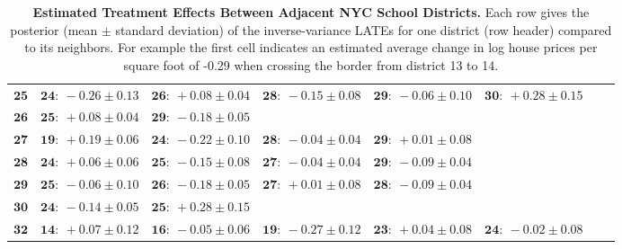 \begin{landscape}
\begin{table}[p]
\begin{tabular}{r|lllllll}
\( \mathbf{25} \)& \( \mathbf{24:}~-0.26 \pm 0.13 \)& \( \mathbf{26:}~+0.08 \pm 0.04 \)& \( \mathbf{28:}~-0.15 \pm 0.08 \)& \( \mathbf{29:}~-0.06 \pm 0.10 \)& \( \mathbf{30:}~+0.28 \pm 0.15 \)\\ 
\( \mathbf{26} \)& \( \mathbf{25:}~+0.08 \pm 0.04 \)& \( \mathbf{29:}~-0.18 \pm 0.05 \)\\ 
\( \mathbf{27} \)& \( \mathbf{19:}~+0.19 \pm 0.06 \)& \( \mathbf{24:}~-0.22 \pm 0.10 \)& \( \mathbf{28:}~-0.04 \pm 0.04 \)& \( \mathbf{29:}~+0.01 \pm 0.08 \)\\ 
\( \mathbf{28} \)& \( \mathbf{24:}~+0.06 \pm 0.06 \)& \( \mathbf{25:}~-0.15 \pm 0.08 \)& \( \mathbf{27:}~-0.04 \pm 0.04 \)& \( \mathbf{29:}~-0.09 \pm 0.04 \)\\ 
\( \mathbf{29} \)& \( \mathbf{25:}~-0.06 \pm 0.10 \)& \( \mathbf{26:}~-0.18 \pm 0.05 \)& \( \mathbf{27:}~+0.01 \pm 0.08 \)& \( \mathbf{28:}~-0.09 \pm 0.04 \)\\ 
\( \mathbf{30} \)& \( \mathbf{24:}~-0.14 \pm 0.05 \)& \( \mathbf{25:}~+0.28 \pm 0.15 \)\\ 
\( \mathbf{32} \)& \( \mathbf{14:}~+0.07 \pm 0.12 \)& \( \mathbf{16:}~-0.05 \pm 0.06 \)& \( \mathbf{19:}~-0.27 \pm 0.12 \)& \( \mathbf{23:}~+0.04 \pm 0.08 \)& \( \mathbf{24:}~-0.02 \pm 0.08 \)\\ 
            \hline
        \end{tabular}
        \caption{
            \label{table:NYC_pairwise}
            \textbf{Estimated Treatment Effects Between Adjacent NYC School Districts.}
            Each row gives the posterior (mean \(\pm\) standard deviation) of the inverse-variance LATEs for one district (row header) compared to its neighbors.
            For example the first cell indicates an estimated average change in log house prices per square foot of -0.29 when crossing the border from district 13 to 14.
        }
    \end{table}
\end{landscape}

